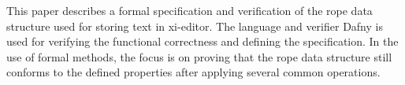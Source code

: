 This paper describes a formal specification and verification of the rope data structure used for storing text in xi-editor.
The language and verifier Dafny is used for verifying the functional correctness and defining the specification.
In the use of formal methods, the focus is on proving that the rope data structure still conforms to the defined properties after applying several common operations.
